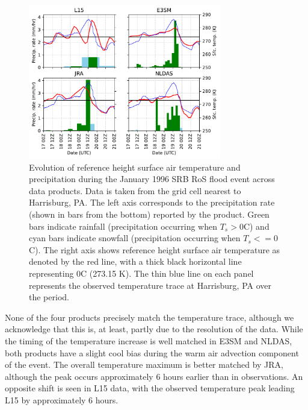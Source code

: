 \documentclass[nhess, manuscript]{copernicus}
\begin{document}

\begin{figure}
\noindent\includegraphics[width=0.75\textwidth]{figs/cropped/precip_vs_t_1996.pdf}
\caption{Evolution of reference height surface air temperature and precipitation during the January 1996 SRB RoS flood event across data products. Data is taken from the grid cell nearest to Harrisburg, PA. The left axis corresponds to the precipitation rate (shown in bars from the bottom) reported by the product. Green bars indicate rainfall (precipitation occurring when $T_s > 0$\degree{}C) and cyan bars indicate snowfall (precipitation occurring when $T_s <= 0$\degree{}C). The right axis shows reference height surface air temperature as denoted by the red line, with a thick black horizontal line representing 0\degree{}C (273.15 K). The thin blue line on each panel represents the observed temperature trace at Harrisburg, PA over the period.}
\label{fig:1996eventtrace}
\end{figure}

None of the four products precisely match the temperature trace, although we acknowledge that this is, at least, partly due to the resolution of the data.
While the timing of the temperature increase is well matched in E3SM and NLDAS, both products have a slight cool bias during the warm air advection component of the event.
The overall temperature maximum is better matched by JRA, although the peak occurs approximately 6 hours earlier than in observations. An opposite shift is seen in L15 data, with the observed temperature peak leading L15 by approximately 6 hours.
\end{document}
